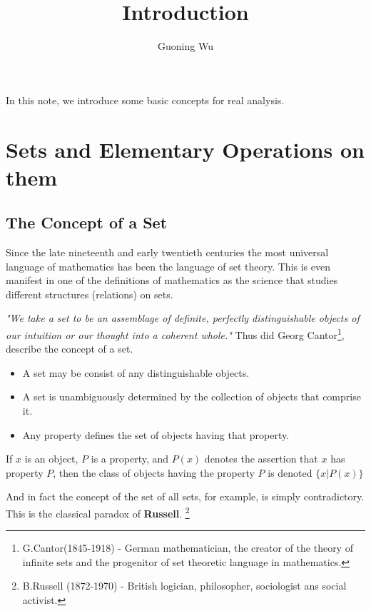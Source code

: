 \documentclass[a4paper,12pt]{article} %
\title{Introduction}
\author{Guoning Wu}
\begin{document}
\setcounter{tocdepth}{2}


\maketitle

In this note, we introduce some basic concepts for real 
analysis.

\section{Sets and Elementary Operations on them}
\subsection{The Concept of a Set}
Since the late nineteenth and early twentieth centuries 
the most universal language of mathematics has been the 
language of set theory. This is even manifest in one of 
the definitions of mathematics as the science that 
studies different structures (relations) on sets.

\emph{"We take a set to be an assemblage of definite, 
perfectly distinguishable objects of our intuition or 
our thought into a coherent whole."} Thus did Georg 
Cantor\footnote{G.Cantor(1845-1918) - German 
mathematician, the creator of the theory of infinite 
sets and the progenitor of set theoretic language in 
mathematics.}, describe the concept of a set.

\begin{itemize}
    \item A set may be consist of any distinguishable 
        objects.
    \item A set is unambiguously determined by the 
        collection of objects that comprise it.
    \item Any property defines the set of objects 
        having that property.
\end{itemize}

If $x$ is an object, $P$ is a property, and $P(x)$ 
denotes the assertion that $x$ has property $P$, 
then the class of objects having the property
$P$ is denoted $\{x\lvert P(x)\}$

And in fact the concept of the set of all sets, for 
example, is simply contradictory. This is the 
classical paradox of \textbf{Russell}. \footnote{B.Russell (1872-1970) - British logician,
philosopher, sociologist ans social activist.}
\end{document}
